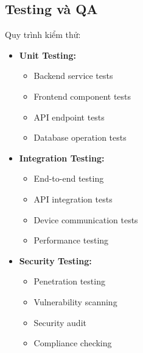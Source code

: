 \subsection{Testing và QA}
\hspace{0.5cm}Quy trình kiểm thử:

\begin{itemize}
    \item \textbf{Unit Testing:}
    \begin{itemize}
        \item Backend service tests
        \item Frontend component tests
        \item API endpoint tests
        \item Database operation tests
    \end{itemize}
    
    \item \textbf{Integration Testing:}
    \begin{itemize}
        \item End-to-end testing
        \item API integration tests
        \item Device communication tests
        \item Performance testing
    \end{itemize}
    
    \item \textbf{Security Testing:}
    \begin{itemize}
        \item Penetration testing
        \item Vulnerability scanning
        \item Security audit
        \item Compliance checking
    \end{itemize}
\end{itemize} 